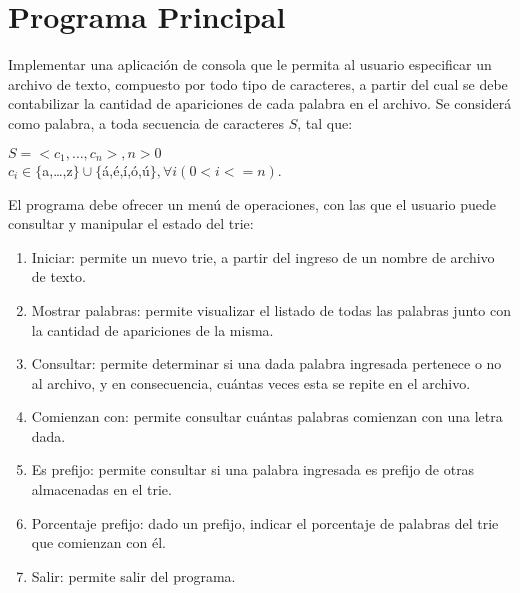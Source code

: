 \documentclass[12pt,a4paper]{article}
\begin{document}
\section{Programa Principal}
Implementar una aplicación de consola que le permita al usuario especificar un archivo de texto, compuesto por todo tipo de caracteres, a partir del cual se debe contabilizar la cantidad de apariciones de cada palabra en el archivo. Se considerá como palabra, a toda secuencia de caracteres $S$, tal que:
\begin{center}
$S=<c_1,\dots,c_n>, n>0$\\
$c_i \in \{$a,\dots,z$\} \cup \{$á,é,í,ó,ú$\}, \forall{i} (0<i<=n)$.
\end{center}

El programa debe ofrecer un menú de operaciones, con las que el usuario puede consultar y manipular el estado del trie:
\begin{enumerate}	
	\item Iniciar: permite un nuevo trie, a partir del ingreso de un nombre de archivo de texto.
	
	\item Mostrar palabras: permite visualizar el listado de todas las palabras junto con la cantidad de apariciones de la misma.
	
	\item Consultar: permite determinar si una dada palabra ingresada pertenece o no al archivo, y en consecuencia, cuántas veces esta se repite en el archivo.
	
	\item Comienzan con: permite consultar cuántas palabras comienzan con una letra dada.
	
	\item Es prefijo: permite consultar si una palabra ingresada es prefijo de otras almacenadas en el trie.

	\item Porcentaje prefijo: dado un prefijo, indicar el porcentaje de palabras del trie que comienzan con él. 
	
	\item Salir: permite salir del programa.
\end{enumerate}
	
\end{document}
